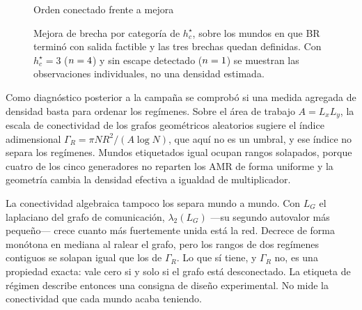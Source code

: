 \begin{figure}[H]\centering
{}
{Orden conectado frente a mejora}
\caption{Mejora de brecha por categoría de $h_c^\star$, sobre los
\NFourHStarLinkN{} mundos en que BR terminó con salida factible y las tres brechas
quedan definidas. Con $h_c^\star=3$ ($n=4$) y sin escape
detectado ($n=1$) se muestran las observaciones
individuales, no una densidad estimada.}
\viuownsource
\end{figure}





Como diagnóstico posterior a la campaña se comprobó si una medida agregada de
densidad basta para ordenar los regímenes. Sobre el área de trabajo $A=L_xL_y$,
la escala de conectividad de los grafos geométricos aleatorios
\citep{penrose2003RandomGeometric} sugiere el índice adimensional
$\Gamma_R=\pi NR^2/(A\log N)$, que aquí no es un umbral, y ese índice no separa
los regímenes. Mundos etiquetados igual ocupan
rangos solapados, porque cuatro de los cinco generadores no reparten los AMR de
forma uniforme y la geometría cambia la densidad efectiva a igualdad de
multiplicador.

La conectividad algebraica tampoco los separa mundo a mundo. Con $L_G$ el
laplaciano del grafo de comunicación, $\lambda_2(L_G)$ ---su segundo autovalor más
pequeño--- crece cuanto más fuertemente unida está la red. Decrece de forma
monótona en mediana al ralear el grafo, pero los rangos de dos regímenes
contiguos se solapan igual que los de $\Gamma_R$. Lo que sí tiene, y
$\Gamma_R$ no, es una propiedad exacta: vale cero si y solo si el grafo está
desconectado. La etiqueta de régimen describe
entonces una consigna de diseño experimental. No mide la conectividad que cada
mundo acaba teniendo.



